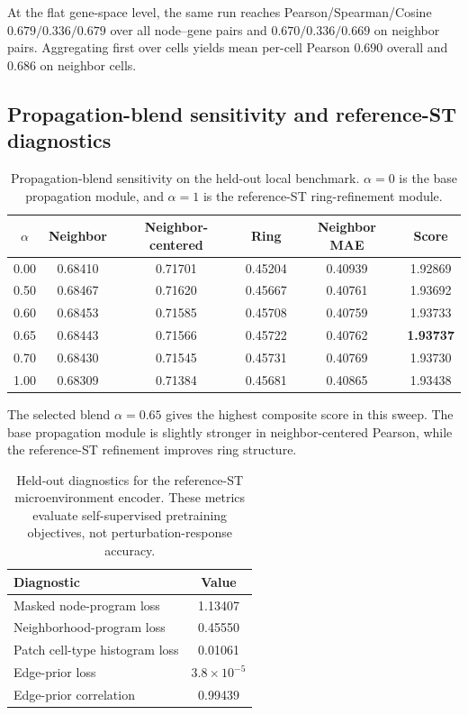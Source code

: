 \documentclass[sigconf,review,balance=false]{acmart}
\begin{document}
At the flat gene-space level, the same run reaches Pearson/Spearman/Cosine $0.679/0.336/0.679$ over all node--gene pairs and $0.670/0.336/0.669$ on neighbor pairs. Aggregating first over cells yields mean per-cell Pearson $0.690$ overall and $0.686$ on neighbor cells.

\subsection{Propagation-blend sensitivity and reference-ST diagnostics}
\label{app:blend_and_reference_diagnostics}

\begin{table}[t]
\centering
\caption{Propagation-blend sensitivity on the held-out local benchmark. $\alpha=0$ is the base propagation module, and $\alpha=1$ is the reference-ST ring-refinement module.}
\label{tab:app_blend_sweep}
\small
\setlength{\tabcolsep}{5pt}
\renewcommand{\arraystretch}{1.10}
\begin{tabular}{cccccc}
\toprule
$\alpha$ & Neighbor & Neighbor-centered & Ring & Neighbor MAE & Score \\
\midrule
0.00 & 0.68410 & 0.71701 & 0.45204 & 0.40939 & 1.92869 \\
0.50 & 0.68467 & 0.71620 & 0.45667 & 0.40761 & 1.93692 \\
0.60 & 0.68453 & 0.71585 & 0.45708 & 0.40759 & 1.93733 \\
0.65 & 0.68443 & 0.71566 & 0.45722 & 0.40762 & \textbf{1.93737} \\
0.70 & 0.68430 & 0.71545 & 0.45731 & 0.40769 & 1.93730 \\
1.00 & 0.68309 & 0.71384 & 0.45681 & 0.40865 & 1.93438 \\
\bottomrule
\end{tabular}
\end{table}

The selected blend $\alpha=0.65$ gives the highest composite score in this sweep. The base propagation module is slightly stronger in neighbor-centered Pearson, while the reference-ST refinement improves ring structure.

\begin{table}[t]
\centering
\caption{Held-out diagnostics for the reference-ST microenvironment encoder. These metrics evaluate self-supervised pretraining objectives, not perturbation-response accuracy.}
\label{tab:app_organ_prior}
\small
\setlength{\tabcolsep}{8pt}
\renewcommand{\arraystretch}{1.12}
\begin{tabular}{lc}
\toprule
Diagnostic & Value \\
\midrule
Masked node-program loss & 1.13407 \\
Neighborhood-program loss & 0.45550 \\
Patch cell-type histogram loss & 0.01061 \\
Edge-prior loss & $3.8\times10^{-5}$ \\
Edge-prior correlation & 0.99439 \\
\bottomrule
\end{tabular}
\end{table}
\end{document}
